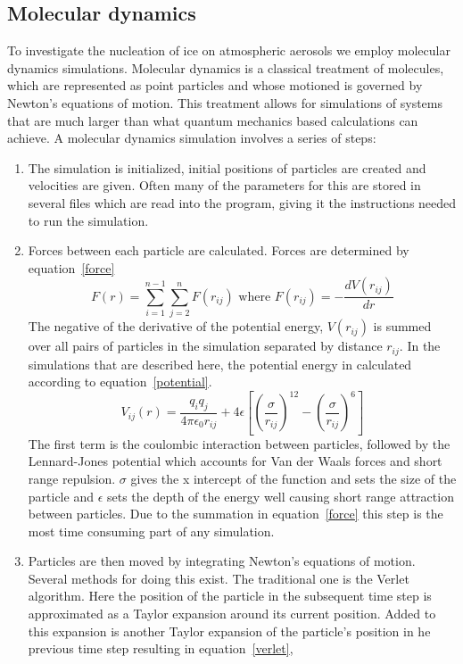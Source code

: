 \documentclass[titlepage]{article}
\begin{document}
\subsection{Molecular dynamics}
\indent To investigate the nucleation of ice on atmospheric aerosols we employ molecular dynamics simulations.  Molecular dynamics is a classical treatment of molecules, which are represented as point particles and whose motioned is governed by Newton's equations of motion.  This treatment allows for simulations of systems that are much larger than what quantum mechanics based calculations can achieve.  A molecular dynamics simulation involves a series of steps\cite{FS02}: \\
\begin{enumerate}
\item The simulation is initialized, initial positions of particles are created and velocities are given.  Often many of the parameters for this are stored in several files which are read into the program, giving it the instructions needed to run the simulation.\\
\item Forces between each particle are calculated.  Forces are determined by equation~\ref{force}
\begin{equation}
F(r)=\sum_{i=1}^{n-1}\sum_{j=2}^{n}F(r_{ij})
\mbox{   where   }
F(r_{ij})=-\frac{dV(r_{ij})}{dr}
\label{force}
\end{equation}
The negative of the derivative of the potential energy, $V(r_{ij})$ is summed over all pairs of particles in the simulation separated by distance $r_{ij}$.  In the simulations that are described here, the potential energy in calculated according to equation~\ref{potential}.
\begin{equation}
V_{ij}(r)=\frac{q_{i}q_{j}}{4\pi\epsilon_{0}r_{ij}} + 4\epsilon\left[ \left(\frac{\sigma}{r_{ij}}\right)^{12} - \left(\frac{\sigma}{r_{ij}}\right)^6\right]
\label{potential}
\end{equation}
The first term is the coulombic interaction between particles, followed by the Lennard-Jones potential which accounts for Van der Waals forces and short range repulsion.  $\sigma$ gives the x intercept of the function and sets the size of the particle and $\epsilon$ sets the depth of the energy well causing short range attraction between particles.  Due to the summation in equation~\ref{force} this step is the most time consuming part of any simulation.\\
\item Particles are then moved by integrating Newton's equations of motion.  Several methods for doing this exist.  The traditional one is the Verlet algorithm.  Here the position of the particle in the subsequent time step is approximated as a Taylor expansion around its current position.  Added to this expansion is another Taylor expansion of the particle's position in he previous time step resulting in equation~\ref{verlet},

\end{enumerate}
\end{document}
